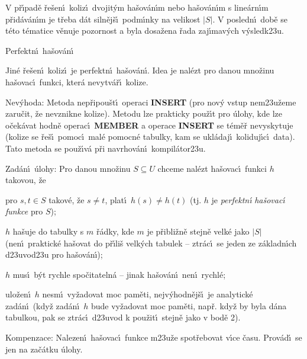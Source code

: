 \documentclass[a4paper,12pt]{article}
\begin{document}
\flushpar V p\v r\'\i pad\v e \v re\v sen\'\i\ 
koliz\'\i\ dvojit\'ym ha\v sov\'an\'\i m nebo ha\v sov\'an\'\i m s 
line\'arn\'\i m p\v rid\'av\'an\'\i m je t\v reba d\'at siln\v ej\v s\'\i\ podm\'\i nky na velikost $
|S|$. V posledn\'\i\ dob\v e se t\'eto t\'ematice 
v\v enuje pozornost a byla dosa\v zena \v rada zaj\'\i mav\'ych v\'ysledk\accent23u.

\heading
Perfektn\'\i\ ha\v sov\'an\'\i
\endheading

\flushpar Jin\'e \v re\v sen\'\i\ koliz\'\i\ je perfektn\'\i\ ha\v sov\'an\'\i . Idea 
je nal\'ezt pro danou mno\v zinu ha\v sovac\'\i\ funkci, kter\'a 
nevytv\'a\v r\'\i\ kolize.
\medskip

\flushpar Nev\'yhoda: Metoda nep\v ripou\v st\'\i\ operaci {\bf INSERT }
(pro nov\'y vstup nem\accent23u\v zeme zaru\v cit, \v ze nevznikne  
kolize). Metodu lze prakticky pou\v z\'\i t pro \'ulohy, kde lze 
o\v cek\'avat hodn\v e operac\'\i\ {\bf MEMBER} a operace {\bf INSERT} se 
t\'em\v e\v r nevyskytuje (kolize se \v re\v s\'\i\ pomoc\'\i\ mal\'e pomocn\'e 
tabulky, kam se ukl\'adaj\'\i\ koliduj\'\i\-c\'\i\ data). Tato metoda se 
pou\v z\'\i v\'a p\v ri navrhov\'an\'\i\ kompil\'ator\accent23u.
\medskip

\flushpar Zad\'an\'\i\ \'ulohy: Pro danou mno\v zinu $S\subseteq 
U$ chceme 
nal\'ezt ha\v so\-va\-c\'\i\ funkci $h$ takovou, \v ze
\roster
\item
pro $s,t\in S$ takov\'e, \v ze $s\ne t$, plat\'\i\ $h(s)\ne h(t)$ (tj. $
h$ je \emph{perfektn\'\i} \emph{ha\v sovac\'\i} \emph{funkce} pro 
$S$); 
\item
$h$ ha\v suje do tabulky s $m$ \v r\'adky, kde $m$ je p\v ribli\v zn\v e 
stejn\v e velk\'e jako $|S|$ (nen\'\i\ praktick\'e ha\v sovat do p\v r\'\i li\v s 
velk\'ych tabulek -- ztr\'ac\'\i\ se jeden ze z\'akladn\'\i ch 
d\accent23uvod\accent23u pro ha\v sov\'an\'\i ); 
\item
$h$ mus\'\i\ b\'yt rychle spo\v citateln\'a -- jinak ha\v sov\'an\'\i\ 
nen\'\i\ rychl\'e;
\item
ulo\v zen\'\i\ $h$ nesm\'\i\ vy\v zadovat moc pam\v eti, 
nejv\'yhodn\v ej\v s\'\i\ je ana\-lytick\'e zad\'an\'\i\ (kdy\v z zad\'an\'\i\ $
h$ bude 
vy\v zadovat moc pam\v eti, nap\v r. kdy\v z by byla d\'ana tabulkou, 
pak se ztr\'ac\'\i\ d\accent23uvod k pou\v zit\'\i\ stejn\v e jako v 
bod\v e 2).
\endroster


\flushpar Kompenzace: Nalezen\'\i\ ha\v sovac\'\i\ funkce 
m\accent23u\v ze spot\v rebovat v\'\i ce \v casu. Prov\'ad\'\i\ se jen na 
za\v c\'atku \'ulohy. 
\medskip
\end{document}
